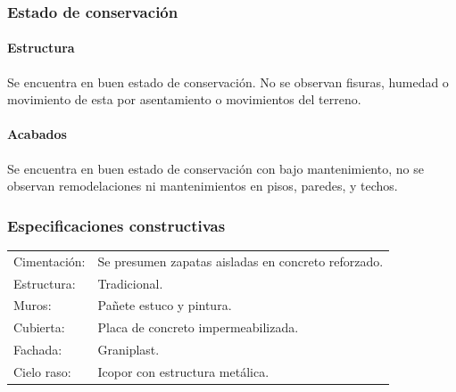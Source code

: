 \documentclass[12pt,a4paper,twoside]{article}
\begin{document}
\subsubsection{Estado de conservación}
%
\paragraph{Estructura}
%
 Se encuentra  en buen estado de conservación. No se observan fisuras, humedad o movimiento de esta por asentamiento o movimientos del terreno.	
%
\paragraph{Acabados}
%
Se encuentra  en buen estado de conservación con bajo mantenimiento, no se observan remodelaciones ni mantenimientos en pisos, paredes, y techos.
%
\subsubsection{Especificaciones constructivas}
%
\begin{tabular}{ l l }
%
   Cimentación: & Se presumen zapatas aisladas en concreto reforzado.\\
   Estructura: & Tradicional.\\
  Muros: & Pañete estuco y pintura.\\
  Cubierta: & Placa de concreto impermeabilizada.\\ %
   Fachada: & Graniplast.\\
   Cielo raso: & Icopor con estructura metálica.\\
%          
 \end{tabular}
%
%
%
\end{document}
